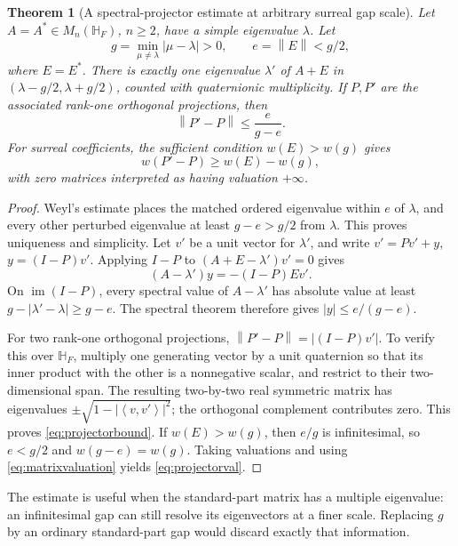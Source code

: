 \documentclass[11pt,letterpaper]{article}
\numberwithin{equation}{section}
\newtheorem{theorem}{Theorem}[section]
\theoremstyle{definition}
\theoremstyle{remark}
\newcommand{\HF}{\mathbb H_F}
\newcommand{\norm}[1]{\left\|#1\right\|}
\newcommand{\angles}[1]{\left\langle#1\right\rangle}
\begin{document}
\begin{theorem}[A spectral-projector estimate at arbitrary surreal gap scale]\label{thm:projector}
Let $A=A^*\in M_n(\HF)$, $n\ge2$, have a simple eigenvalue $\lambda$. Let
\[
 g=\min_{\mu\ne\lambda}|\mu-\lambda|>0,
 \qquad e=\norm E<g/2,
\]
where $E=E^*$. There is exactly one eigenvalue $\lambda'$ of $A+E$ in
$(\lambda-g/2,\lambda+g/2)$, counted with quaternionic multiplicity.
If $P,P'$ are the associated rank-one orthogonal projections, then
\begin{equation}\label{eq:projectorbound}
 \norm{P'-P}\le\frac{e}{g-e}.
\end{equation}
For surreal coefficients, the sufficient condition $w(E)>w(g)$ gives
\begin{equation}\label{eq:projectorval}
 w(P'-P)\ge w(E)-w(g),
\end{equation}
with zero matrices interpreted as having valuation $+\infty$.
\end{theorem}
\begin{proof}
Weyl's estimate places the matched ordered eigenvalue within $e$ of $\lambda$, and every
other perturbed eigenvalue at least $g-e>g/2$ from $\lambda$. This proves uniqueness and
simplicity. Let $v'$ be a unit vector for $\lambda'$, and write
$v'=Pv'+y$, $y=(I-P)v'$. Applying $I-P$ to
$(A+E-\lambda')v'=0$ gives
\[
 (A-\lambda')y=-(I-P)Ev'.
\]
On $\operatorname{im}(I-P)$, every spectral value of $A-\lambda'$ has absolute value at
least $g-|\lambda'-\lambda|\ge g-e$. The spectral theorem therefore gives
$|y|\le e/(g-e)$.

For two rank-one orthogonal projections, $\norm{P'-P}=|(I-P)v'|$.
To verify this over $\HF$, multiply one generating vector by a unit quaternion so that its
inner product with the other is a nonnegative scalar, and restrict to their two-dimensional
span. The resulting two-by-two real symmetric matrix has eigenvalues
$\pm\sqrt{1-|\angles{v,v'}|^2}$; the orthogonal complement contributes zero.
This proves \eqref{eq:projectorbound}.
If $w(E)>w(g)$, then $e/g$ is infinitesimal, so $e<g/2$ and $w(g-e)=w(g)$.
Taking valuations and using \eqref{eq:matrixvaluation} yields \eqref{eq:projectorval}.
\end{proof}

The estimate is useful when the standard-part matrix has a multiple eigenvalue: an
infinitesimal gap can still resolve its eigenvectors at a finer scale. Replacing $g$ by an
ordinary standard-part gap would discard exactly that information.
\end{document}
